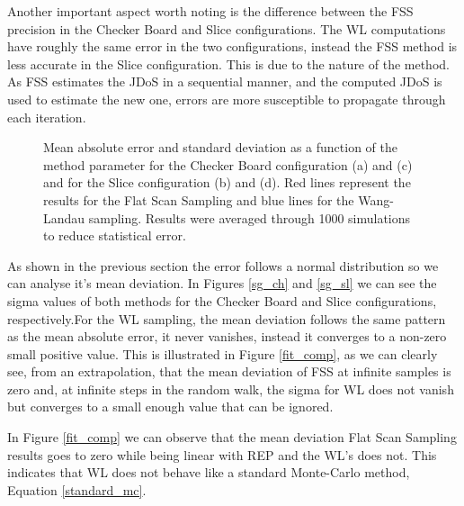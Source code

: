 	Another important aspect worth noting is the difference between the FSS precision in the Checker Board and Slice configurations. The WL computations have roughly the same error in the two configurations, instead the FSS method is less accurate in the Slice configuration. This is due to the nature of the method. As FSS estimates the JDoS in a sequential manner, and the computed JDoS is used to estimate the new one, errors are more susceptible to propagate through each iteration.
	
	\pagebreak
	
\begin{figure}[h]
	\centering

	
	\caption{Mean absolute error and standard deviation as a function of the method parameter for the Checker Board configuration (a) and (c) and for the Slice configuration (b) and (d). Red lines represent the results for the Flat Scan Sampling and blue lines for the Wang-Landau sampling. Results were averaged through 1000 simulations to reduce statistical error.}
\end{figure}

	As shown in the previous section the error follows a normal distribution so we can analyse it's mean deviation. In Figures \ref{sg_ch} and \ref{sg_sl} we can see the sigma values of both methods for the Checker Board and Slice configurations, respectively.For the WL sampling, the mean deviation follows the same pattern as the mean absolute error, it never vanishes, instead it converges to a non-zero small positive value. This is illustrated in Figure \ref{fit_comp}, as we can clearly see, from an extrapolation, that the mean deviation of FSS at infinite samples is zero and, at infinite steps in the random walk, the sigma for WL does not vanish but converges to a small enough value that can be ignored.

	In Figure \ref{fit_comp} we can observe that the mean deviation Flat Scan Sampling results goes to zero while being linear with REP and the WL's does not. This indicates that WL does not behave like a standard Monte-Carlo method, Equation \ref{standard_mc}. 

